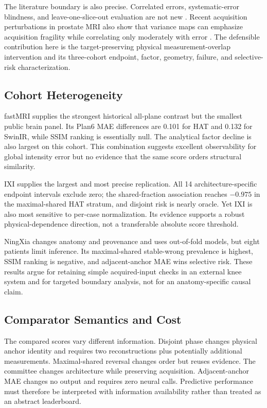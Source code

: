 \documentclass[journal,10pt]{IEEEtran}
\begin{document}
The literature boundary is also precise. Correlated errors, systematic-error blindness, and leave-one-slice-out evaluation are not new \cite{brown2005diversity,hu2021predict,horvath2017highorder}. Recent acquisition perturbations in prostate MRI also show that variance maps can emphasize acquisition fragility while correlating only moderately with error \cite{vandervelde2026prostate}. The defensible contribution here is the target-preserving physical measurement-overlap intervention and its three-cohort endpoint, factor, geometry, failure, and selective-risk characterization.

\subsection{Cohort Heterogeneity}
fastMRI supplies the strongest historical all-plane contrast but the smallest public brain panel. Its Plan6 MAE differences are 0.101 for HAT and 0.132 for SwinIR, while SSIM ranking is essentially null. The analytical factor decline is also largest on this cohort. This combination suggests excellent observability for global intensity error but no evidence that the same score orders structural similarity.

IXI supplies the largest and most precise replication. All 14 architecture-specific endpoint intervals exclude zero; the shared-fraction association reaches $-0.975$ in the maximal-shared HAT stratum, and disjoint risk is nearly oracle. Yet IXI is also most sensitive to per-case normalization. Its evidence supports a robust physical-dependence direction, not a transferable absolute score threshold.

NingXia changes anatomy and provenance and uses out-of-fold models, but eight patients limit inference. Its maximal-shared stable-wrong prevalence is highest, SSIM ranking is negative, and adjacent-anchor MAE wins selective risk. These results argue for retaining simple acquired-input checks in an external knee system and for targeted boundary analysis, not for an anatomy-specific causal claim.

\subsection{Comparator Semantics and Cost}
The compared scores vary different information. Disjoint phase changes physical anchor identity and requires two reconstructions plus potentially additional measurements. Maximal-shared reversal changes order but reuses evidence. The committee changes architecture while preserving acquisition. Adjacent-anchor MAE changes no output and requires zero neural calls. Predictive performance must therefore be interpreted with information availability rather than treated as an abstract leaderboard.
\end{document}
